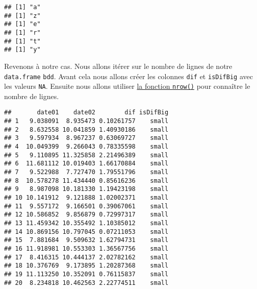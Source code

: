 \documentclass[]{book}
\newenvironment{Shaded}{\begin{snugshade}}{\end{snugshade}}
\newcommand{\KeywordTok}[1]{\textcolor[rgb]{0.13,0.29,0.53}{\textbf{#1}}}
\newcommand{\DataTypeTok}[1]{\textcolor[rgb]{0.13,0.29,0.53}{#1}}
\newcommand{\DecValTok}[1]{\textcolor[rgb]{0.00,0.00,0.81}{#1}}
\newcommand{\StringTok}[1]{\textcolor[rgb]{0.31,0.60,0.02}{#1}}
\newcommand{\OtherTok}[1]{\textcolor[rgb]{0.56,0.35,0.01}{#1}}
\newcommand{\ControlFlowTok}[1]{\textcolor[rgb]{0.13,0.29,0.53}{\textbf{#1}}}
\newcommand{\OperatorTok}[1]{\textcolor[rgb]{0.81,0.36,0.00}{\textbf{#1}}}
\newcommand{\NormalTok}[1]{#1}
\theoremstyle{definition}
\theoremstyle{definition}
\theoremstyle{definition}
\theoremstyle{remark}
\begin{document}
\begin{verbatim}
## [1] "a"
## [1] "z"
## [1] "e"
## [1] "r"
## [1] "t"
## [1] "y"
\end{verbatim}

Revenons à notre cas. Nous allons itérer sur le nombre de lignes de
notre \texttt{data.frame} \texttt{bdd}. Avant cela nous allons créer les
colonnes \texttt{dif} et \texttt{isDifBig} avec les valeurs \texttt{NA}.
Ensuite nous allons utiliser \protect\hyperlink{l015nrow}{la fonction
\texttt{nrow()}} pour connaître le nombre de lignes.

\begin{Shaded}
\end{Shaded}

\begin{verbatim}
##       date01    date02        dif isDifBig
## 1   9.038091  8.935473 0.10261757    small
## 2   8.632558 10.041859 1.40930186    small
## 3   9.597934  8.967237 0.63069727    small
## 4  10.049399  9.266043 0.78335598    small
## 5   9.110895 11.325858 2.21496389    small
## 6  11.681112 10.019403 1.66170884    small
## 7   9.522988  7.727470 1.79551796    small
## 8  10.578278 11.434440 0.85616236    small
## 9   8.987098 10.181330 1.19423198    small
## 10 10.141912  9.121888 1.02002371    small
## 11  9.557172  9.166501 0.39067061    small
## 12 10.586852  9.856879 0.72997317    small
## 13 11.459342 10.355492 1.10385012    small
## 14 10.869156 10.797045 0.07211053    small
## 15  7.881684  9.509632 1.62794731    small
## 16 11.918981 10.553303 1.36567756    small
## 17  8.416315 10.444137 2.02782162    small
## 18 10.376769  9.173895 1.20287368    small
## 19 11.113250 10.352091 0.76115837    small
## 20  8.234818 10.462563 2.22774511    small
\end{verbatim}
\end{document}
